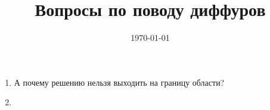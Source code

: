 \documentclass[a4paper,12pt]{article}
\title{Вопросы по поводу диффуров}
\date{\today}
\author{}
\begin{document}
\maketitle

\begin{enumerate}
  \item А почему решению нельзя выходить на границу области?
  \item 
\end{enumerate}
\end{document}
